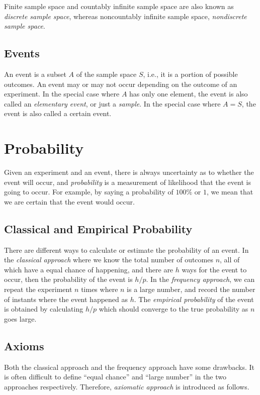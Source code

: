 Finite sample space and countably infinite sample space are also known as \textit{discrete sample space}, whereas noncountably infinite sample space, \textit{nondiscrete sample space}.


\subsection{Events}

An event is a subset $A$ of the sample space $S$, i.e., it is a portion of possible outcomes. An event may or may not occur depending on the outcome of an experiment. In the special case where $A$ has only one element, the event is also called an \textit{elementary event}, or just a \textit{sample}. In the special case where $A=S$, the event is also called a certain event.

\section{Probability}

Given an experiment and an event, there is always uncertainty as to whether the event will occur, and \textit{probability} is a measurement of likelihood that the event is going to occur. For example, by saying a probability of $100\%$ or $1$, we mean that we are certain that the event would occur.

\subsection{Classical and Empirical Probability}

There are different ways to calculate or estimate the probability of an event. In the \textit{classical approach} where we know the total number of outcomes $n$, all of which have a equal chance of happening, and there are $h$ ways for the event to occur, then the probability of the event is $h/p$. In the \textit{frequency approach}, we can repeat the experiment $n$ times where $n$ is a large number, and record the number of instants where the event happened as $h$. The \textit{empirical probability} of the event is obtained by calculating $h/p$ which should converge to the true probability as $n$ goes large.

\subsection{Axioms}


Both the classical approach and the frequency approach have some drawbacks. It is often difficult to define ``equal chance'' and ``large number'' in the two approaches respectively. Therefore, \textit{axiomatic approach} is introduced as follows.

